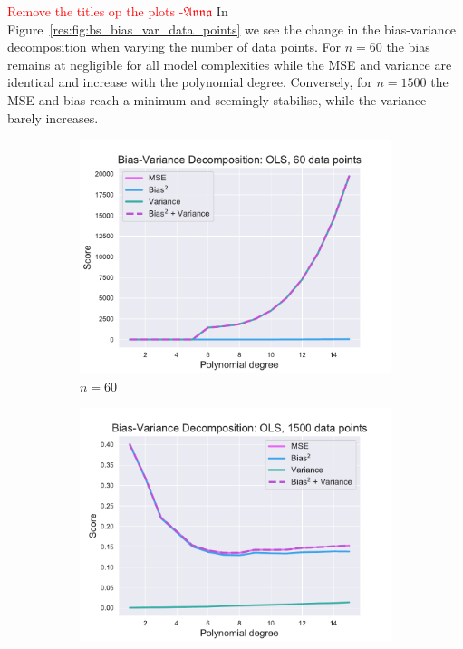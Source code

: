 \documentclass[twocolumn,english,notitlepage]{article}
\newcommand{\comment}[1]{\textcolor{red}{#1}}
\newcommand{\Anna}{$\mathfrak{Anna}$}
\begin{document}
            \comment{Remove the titles op the plots -\Anna}
            In Figure~\ref{res:fig:bs_bias_var_data_points} we see the change in the bias-variance decomposition when varying the number of data points. For $n=60$ the bias remains at negligible for all model complexities while the MSE and variance are identical and increase with the polynomial degree. Conversely, for $n=1500$ the MSE and bias reach a minimum and seemingly stabilise, while the variance barely increases. 
            \begin{figure}[ht]
                \begin{subfigure}{.5\textwidth}
                    \centering
                    \includegraphics[width=.9\linewidth]{BS_Bias_var_decomp_OLS_60_data_points.pdf}
                    \caption{$n=60$}
                    \end{subfigure}
                \begin{subfigure}{.5\textwidth}
                    \centering
                    \includegraphics[width=.9\linewidth]{BS_Bias_var_decomp_OLS_1500_data_points.pdf}

\end{subfigure}
\end{figure}
\end{document}
